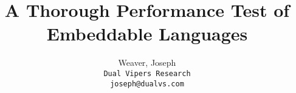 \documentclass[twocolumn]{article}
\begin{document}
\title{A Thorough Performance Test of Embeddable Languages}
\author{
	Weaver, Joseph \\
    \texttt{Dual Vipers Research} \\
	\texttt{joseph@dualvs.com}
}
\maketitle













\printbibliography


\end{document}
